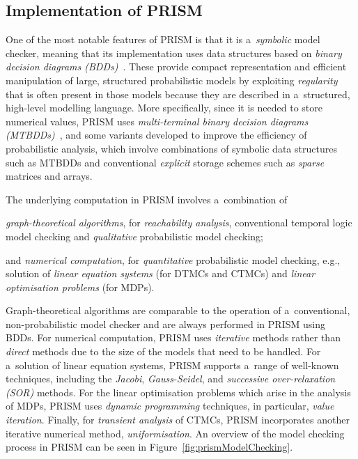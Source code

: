 \documentclass[a4paper, 11pt]{article}
\theoremstyle{definition}
\begin{document}
\subsection{Implementation of PRISM}

One of the most notable features of PRISM is that it is a~\emph{symbolic}
model checker, meaning that its implementation uses data structures based
on \emph{binary decision diagrams (BDDs)}~\cite{handbookOfModelCheck}. These
provide compact representation and efficient manipulation of large,
structured probabilistic models by exploiting \emph{regularity} that is
often present in those models because they are described in a~structured,
high-level modelling language. More specifically, since it is needed to
store numerical values, PRISM uses \emph{multi-terminal binary decision
diagrams (MTBDDs)}~\cite{probModelCheckLec}, and some variants
developed to improve the efficiency of probabilistic analysis, which involve
combinations of symbolic data structures such as MTBDDs and conventional
\emph{explicit} storage schemes such as \emph{sparse} matrices and arrays.

The underlying computation in PRISM involves a~combination of
\begin{enumerate*}[label={(\roman*)}]
    \item
        \emph{graph-theoretical algorithms}, for \emph{reachability
        analysis}, conventional temporal logic model checking and
        \emph{qualitative} probabilistic model checking;

    \item
        and \emph{numerical computation}, for \emph{quantitative}
        probabilistic model checking, e.g., solution of \emph{linear
        equation systems} (for DTMCs and CTMCs) and \emph{linear
        optimisation problems} (for MDPs).
\end{enumerate*}
Graph-theoretical algorithms are comparable to the operation of
a~conventional, non-probabilistic model checker and are always performed
in PRISM using BDDs. For numerical computation, PRISM uses \emph{iterative}
methods rather than \emph{direct} methods due to the size of the models that
need to be handled. For a~solution of linear equation systems, PRISM
supports a~range of well-known techniques, including the \emph{Jacobi},
\emph{Gauss-Seidel}, and \emph{successive over-relaxation (SOR)} methods.
For the linear optimisation problems which arise in the analysis of MDPs,
PRISM uses \emph{dynamic programming} techniques, in particular,
\emph{value iteration}. Finally, for \emph{transient analysis} of CTMCs,
PRISM incorporates another iterative numerical method, \emph{uniformisation}.
An overview of the model checking process in PRISM can be seen in
Figure~\ref{fig:prismModelChecking}.
\end{document}
